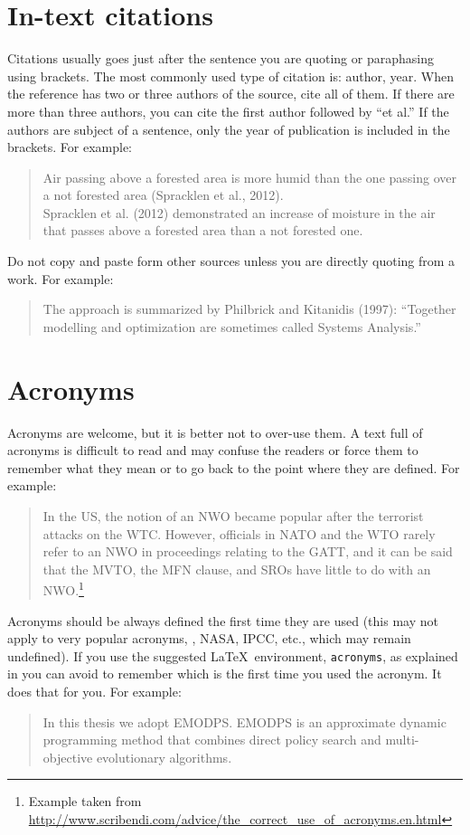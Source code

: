 \section{In-text citations}\label{sec:citations}
Citations usually goes just after the sentence you are quoting or paraphasing using brackets. 
The most commonly used type of citation is: author, year. 
When the reference has two or three authors of the source, cite all of them.
If there are more than three authors, you can cite the first author followed by \enquote{et al.} 
If the authors are subject of a sentence, only the year of publication is included in the brackets.
For example: \\
\blockquote{Air passing above a forested area is more humid than the one passing over a not forested area (Spracklen et al., 2012). \\
Spracklen et al. (2012) demonstrated an increase of moisture in the air that passes above a forested area than a not forested one. }

Do not copy and paste form other sources unless you are directly quoting from a work.
For example:\\
\blockquote{The approach is summarized by Philbrick and Kitanidis (1997): \enquote{Together modelling and optimization are sometimes called Systems Analysis.}}

\section{Acronyms}
Acronyms are welcome, but it is better not to over-use them. 
A text full of acronyms is difficult to read and may confuse the readers or force them to remember what they mean or to go back to the point where they are defined.
For example:\\
\blockquote{In the US, the notion of an NWO became popular after the terrorist attacks on the WTC. However, officials in NATO and the WTO rarely refer to an NWO in proceedings relating to the GATT, and it can be said that the MVTO, the MFN clause, and SROs have little to do with an NWO.\footnote{Example taken from \url{http://www.scribendi.com/advice/the_correct_use_of_acronyms.en.html}}}.

Acronyms should be always defined the first time they are used (this may not apply to very popular acronyms, \eg, NASA, IPCC, etc., which may remain undefined).
If you use the suggested \LaTeX\ environment, \verb!acronyms!, as explained in  you can avoid to remember which is the first time you used the acronym.
It does that for you.
For example:\\
\blockquote{In this thesis we adopt \acf{EMODPS}. \ac{EMODPS} is an approximate dynamic programming method that combines direct policy search and multi-objective evolutionary algorithms.} %

